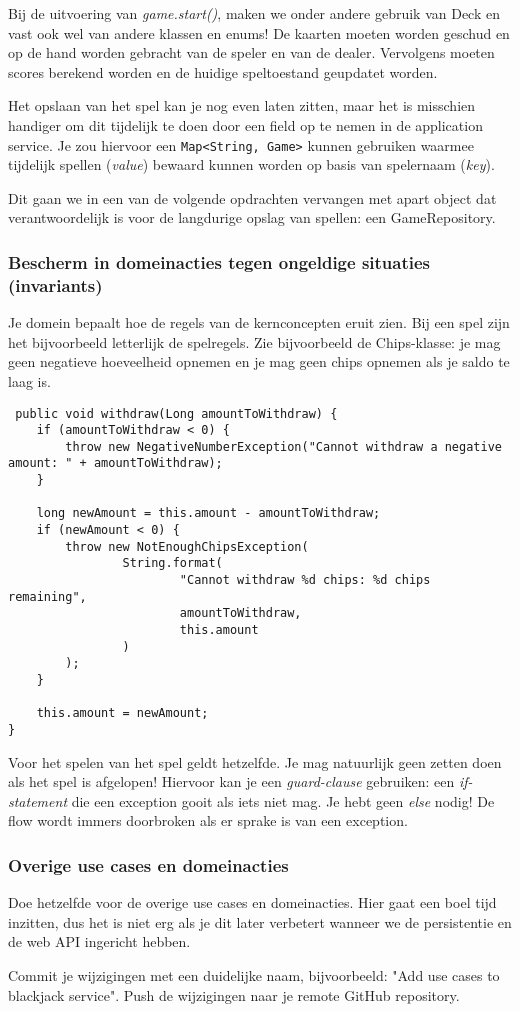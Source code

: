 \documentclass[dutch,a4paper,12pt,doubleside]{book}
\begin{document}
Bij de uitvoering van \textit{game.start()}, maken we onder andere gebruik van 
Deck en vast ook wel van andere klassen en enums! 
De kaarten moeten worden geschud en op de hand worden gebracht van de speler 
en van de dealer. Vervolgens moeten scores berekend worden en de huidige speltoestand 
geupdatet worden.

Het opslaan van het spel kan je nog even laten zitten,
maar het is misschien handiger om dit tijdelijk te doen 
door een field op te nemen in de application service.
Je zou hiervoor een \texttt{Map<String, Game>} kunnen gebruiken 
waarmee tijdelijk spellen (\textit{value}) bewaard kunnen worden 
op basis van spelernaam (\textit{key}).

Dit gaan we in een van de volgende opdrachten vervangen met apart object dat verantwoordelijk 
is voor de langdurige opslag van spellen: een GameRepository.

\subsubsection{Bescherm in domeinacties tegen ongeldige situaties (invariants)}
Je domein bepaalt hoe de regels van de kernconcepten eruit zien.
Bij een spel zijn het bijvoorbeeld letterlijk de spelregels.
Zie bijvoorbeeld de Chips-klasse: je mag geen negatieve hoeveelheid opnemen 
en je mag geen chips opnemen als je saldo te laag is.

\begin{verbatim}
 public void withdraw(Long amountToWithdraw) {
    if (amountToWithdraw < 0) {
        throw new NegativeNumberException("Cannot withdraw a negative amount: " + amountToWithdraw);
    }

    long newAmount = this.amount - amountToWithdraw;
    if (newAmount < 0) {
        throw new NotEnoughChipsException(
                String.format(
                        "Cannot withdraw %d chips: %d chips remaining",
                        amountToWithdraw,
                        this.amount
                )
        );
    }

    this.amount = newAmount;
}    
\end{verbatim}

Voor het spelen van het spel geldt hetzelfde. Je mag natuurlijk 
geen zetten doen als het spel is afgelopen! Hiervoor kan je een \textit{guard-clause} gebruiken:
een \textit{if-statement} die een exception gooit als iets niet mag. Je hebt geen \textit{else} nodig! 
De flow wordt immers doorbroken als er sprake is van een exception.

\subsubsection{Overige use cases en domeinacties}
Doe hetzelfde voor de overige use cases en domeinacties. 
Hier gaat een boel tijd inzitten, 
dus het is niet erg als je dit later verbetert wanneer we 
de persistentie en de web API ingericht hebben.

Commit je wijzigingen met een duidelijke naam, 
bijvoorbeeld: "Add use cases to blackjack service". 
Push de wijzigingen naar je remote GitHub repository.
\end{document}
